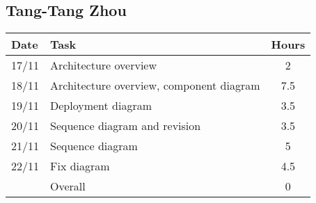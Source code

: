 \subsection{Tang-Tang Zhou}

\begin{table}[H]
\begin{tabularx}{\textwidth}{|l|X|c|}
\hline
\rowcolor[HTML]{C0C0C0} 
Date & Task & Hours\\ \hline
17/11 & Architecture overview & 2\\ \hline
18/11 & Architecture overview, component diagram & 7.5 \\ \hline
19/11 & Deployment diagram & 3.5\\ \hline
20/11 & Sequence diagram and revision & 3.5\\ \hline
21/11 & Sequence diagram & 5 \\ \hline
22/11 & Fix diagram & 4.5 \\ \hline
\rowcolor[HTML]{C0C0C0} 
& Overall & 0 \\ \hline
\end{tabularx}
\end{table}